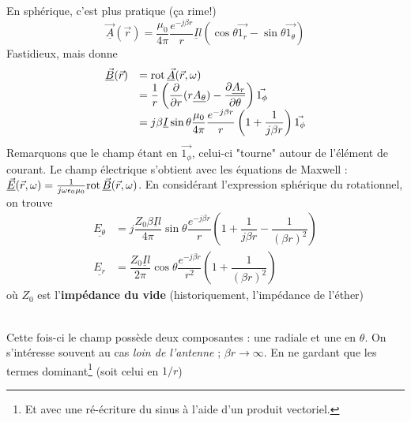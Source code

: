 	En sphérique, c'est plus pratique (ça rime!)
	\begin{equation}
	\underline{\vec{A}}(\vec{r}) = \dfrac{\mu_0}{4\pi}\dfrac{e^{-j\beta r}}{r}\underline{I}l
	\left(\cos\theta\vec{1_r}-\sin\theta\vec{1_\theta}\right)
	\end{equation}
	Fastidieux, mais donne
	\begin{equation}
	\begin{array}{ll}
	\underline{\vec{B}}(\vec{r}) &= \rot \underline{\vec{A}}(\vec{r},\omega)\\
	&=\dfrac{1}{r}\left(\dfrac{\partial}{\partial r}(r\underline{A_\theta})-\dfrac{\partial 
	\underline{A_r}}{\partial \theta}\right)\vec{1_\phi}\\
	&= j\beta\underline{I}\sin\theta\dfrac{\mu_0}{4\pi}\dfrac{e^{-j\beta r}}{r}\left(1+
	\dfrac{1}{j\beta r}\right)\vec{1_\phi}
	\end{array}
	\end{equation}
	Remarquons que le champ étant en $\vec{1_\phi}$, celui-ci "tourne" autour de l'élément 
	de courant.	Le champ électrique s'obtient avec les équations de Maxwell : 
	$\underline{\vec{E}}(\vec{r},\omega) = \frac{1}{j\omega\epsilon_0\mu_0}\rot\underline{
	\vec{B}}(\vec{r},\omega)$. En considérant l'expression sphérique du rotationnel, on 
	trouve
	\begin{equation}
	\begin{array}{ll}
	\underline{E_\theta} &= j\dfrac{Z_0\beta\underline{I}l}{4\pi}\sin\theta\dfrac{e^{-j\beta r}}{
	r} \left(1+\dfrac{1}{j\beta r}-\dfrac{1}{(\beta r)^2}\right)\\
	\underline{E_r} &= \dfrac{Z_0\underline{I}l}{2\pi}\cos\theta \dfrac{e^{-j\beta r}}{r^2}
	\left(1+\dfrac{1}{(\beta r)^2}\right)
	\end{array}
	\end{equation}
	où $Z_0$ est l'\textbf{impédance du vide} (historiquement, l'impédance de l'éther)\\
	
	\ 
	
	Cette fois-ci le champ possède deux composantes : une radiale et une en $\theta$. 
	On s'intéresse souvent au cas \textit{loin de l'antenne} ; $\beta r \rightarrow\infty$. 
	En ne gardant que les termes dominant\footnote{Et avec une ré-écriture du sinus à l'aide 
	d'un produit vectoriel.} (soit celui en $1/r$)
	\ \\
	
